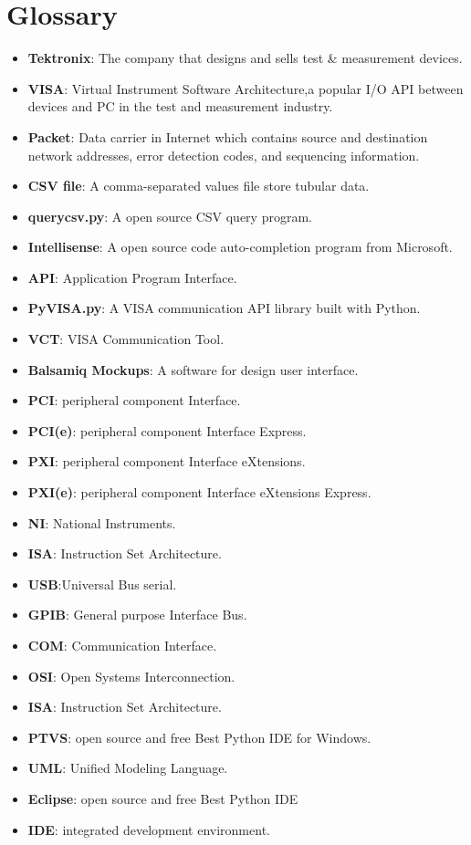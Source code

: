 \documentclass [10pt]{article}
\begin{document}
\section{Glossary}
\begin{itemize}
\item \textbf{Tektronix}: The company that designs and sells test \& measurement devices.
\item \textbf{VISA}: Virtual Instrument Software Architecture,a popular I/O API between devices and PC in the test and measurement industry.
\item \textbf{Packet}: Data carrier in Internet which contains source and destination network addresses, error detection codes, and sequencing information.
\item \textbf{CSV file}: A comma-separated values file store tubular data.
\item \textbf{querycsv.py}: A open source CSV query program.
\item \textbf{Intellisense}: A open source code auto-completion program from Microsoft. 
\item \textbf{API}: Application Program Interface.
\item \textbf{PyVISA.py}: A VISA communication API library built with Python.
\item \textbf{VCT}: VISA Communication Tool.
\item \textbf{Balsamiq Mockups}: A software for design user interface.
\item \textbf{PCI}: peripheral component Interface.
\item \textbf{PCI(e)}: peripheral component Interface Express.
\item \textbf{PXI}: peripheral component Interface eXtensions.
\item \textbf{PXI(e)}: peripheral component Interface eXtensions Express.
\item \textbf{NI}: National Instruments.
\item \textbf{ISA}: Instruction Set Architecture.
\item \textbf{USB}:Universal Bus serial.
\item \textbf{GPIB}: General purpose Interface Bus.
\item \textbf{COM}: Communication Interface.
\item \textbf{OSI}: Open Systems Interconnection.
\item \textbf{ISA}: Instruction Set Architecture.
\item \textbf{PTVS}: open source and free Best Python IDE for Windows.
\item \textbf{UML}: Unified Modeling Language.
\item \textbf{Eclipse}:  open source and free Best Python IDE 
\item \textbf{IDE}:  integrated development environment.

\end{itemize}
\newpage
\end{document}
